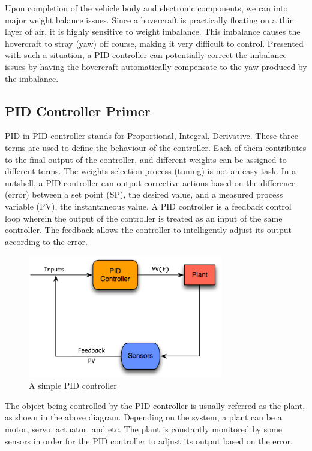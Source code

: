 Upon completion of the vehicle body and electronic components, we ran into major
weight balance issues. Since a hovercraft is practically floating on a thin
layer of air, it is highly sensitive to weight imbalance. This imbalance causes
the hovercraft to stray (yaw) off course, making it very difficult to control.
Presented with such a situation, a PID controller can potentially correct the
imbalance issues by having the hovercraft automatically compensate to the yaw
produced by the imbalance.

\subsection{PID Controller Primer}
PID in PID controller stands for Proportional, Integral, Derivative. These three
terms are used to define the behaviour of the controller. Each of them
contributes to the final output of the controller, and different weights can be
assigned to different terms. The weights selection process (tuning) is not an
easy task. In a nutshell, a PID controller can output corrective actions based
on the difference (error) between a set point (SP), the desired value, and a
measured process variable (PV), the instantaneous value. A PID controller is a
feedback control loop wherein the output of the controller is treated as an
input of the same controller. The feedback allows the controller to
intelligently adjust its output according to the error. 

\begin{figure}[ht]
  \begin{center}
    \includegraphics[width=85mm]{imageSources/pidcontroller.png}
  \end{center}
  \caption{A simple PID controller} 
  \label{pidController}
\end{figure}

The object being controlled by the PID controller is usually referred as the
plant, as shown in the above diagram. Depending on the system, a plant can be a
motor, servo, actuator, and etc. The plant is constantly monitored by some
sensors in order for the PID controller to adjust its output based on the error.

